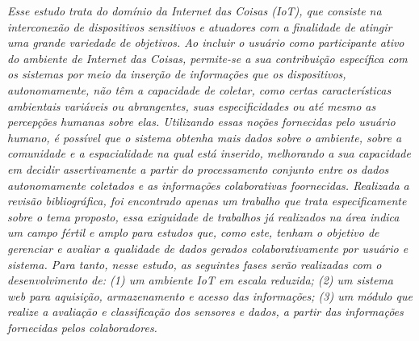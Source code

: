 \emph{
Esse estudo trata do domínio da Internet das Coisas (IoT), que consiste na interconexão de dispositivos
 sensitivos e atuadores com a finalidade de atingir uma grande variedade de objetivos.
 Ao incluir o usuário como participante ativo do ambiente de Internet das Coisas,
 permite-se a sua contribuição específica com os sistemas por meio da inserção de informações que os
  dispositivos, autonomamente, não têm a capacidade de coletar,
 como certas características ambientais variáveis ou abrangentes, suas especificidades ou até
  mesmo as percepções humanas sobre elas.
  Utilizando essas noções fornecidas pelo usuário humano, é possível que o sistema obtenha mais
  dados sobre o ambiente, sobre a comunidade e a espacialidade na qual está inserido, melhorando
  a sua capacidade em decidir assertivamente a partir do processamento conjunto entre os dados autonomamente
  coletados e as informações colaborativas foornecidas.
  Realizada a revisão bibliográfica, foi encontrado apenas um trabalho que trata especificamente sobre o tema proposto, essa
  exiguidade de trabalhos já realizados na área indica um campo fértil e amplo para estudos que,
  como este, tenham o objetivo de gerenciar e avaliar a qualidade de dados gerados colaborativamente por usuário e sistema.
  Para tanto, nesse estudo, as seguintes fases serão realizadas com o desenvolvimento de: (1) um ambiente IoT em escala reduzida;
  (2) um sistema web para aquisição, armazenamento e acesso das informações;
  (3) um módulo que realize a avaliação e classificação dos sensores e dados,
  a partir das informações fornecidas pelos colaboradores.
}
